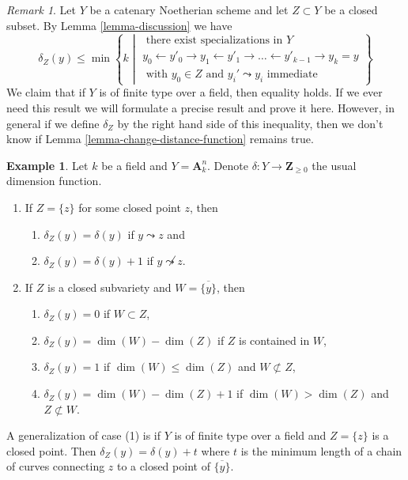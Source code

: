 \documentclass[10pt,a4paper]{amsart}
\theoremstyle{plain}
\theoremstyle{definition}
\newtheorem{example}[subsection]{Example}
\theoremstyle{remark}
\newtheorem{remark}[subsection]{Remark}
\numberwithin{equation}{subsection}
\begin{document}
\begin{remark}
\label{remark-discussion}
Let $Y$ be a catenary Noetherian scheme and let $Z \subset Y$
be a closed subset. By Lemma \ref{lemma-discussion} we have
$$
\delta_Z(y) \leq \min
\left\{ k \middle|
\begin{matrix}
\text{ there exist specializations in }Y \\
y_0 \leftarrow y'_0 \rightarrow y_1 \leftarrow y'_1 \rightarrow \ldots
\leftarrow y'_{k - 1} \rightarrow y_k = y \\
\text{ with }y_0 \in Z\text{ and }y_i' \leadsto y_i
\text{ immediate}
\end{matrix}
\right\}
$$
We claim that if $Y$ is of finite type over a field,
then equality holds. If we ever need this result we
will formulate a precise result and prove it here.
However, in general if we define $\delta_Z$
by the right hand side of this inequality, then we don't
know if Lemma \ref{lemma-change-distance-function} remains true.
\end{remark}

\begin{example}
\label{example-distance}
Let $k$ be a field and $Y = \mathbf{A}^n_k$. Denote
$\delta : Y \to \mathbf{Z}_{\geq 0}$ the usual dimension function.
\begin{enumerate}
\item If $Z = \{z\}$ for some closed point $z$, then
\begin{enumerate}
\item $\delta_Z(y) = \delta(y)$ if $y \leadsto z$ and
\item $\delta_Z(y) = \delta(y) + 1$ if $y \not \leadsto z$.
\end{enumerate}
\item If $Z$ is a closed subvariety and $W = \overline{\{y\}}$, then
\begin{enumerate}
\item $\delta_Z(y) = 0$ if $W \subset Z$,
\item $\delta_Z(y) = \dim(W) - \dim(Z)$ if $Z$ is contained in $W$,
\item $\delta_Z(y) = 1$ if $\dim(W) \leq \dim(Z)$ and $W \not \subset Z$,
\item $\delta_Z(y) = \dim(W) - \dim(Z) + 1$ if $\dim(W) > \dim(Z)$
and $Z \not \subset W$.
\end{enumerate}
\end{enumerate}
A generalization of case (1) is if $Y$ is of finite type over a field
and $Z = \{z\}$ is a closed point. Then $\delta_Z(y) = \delta(y) + t$
where $t$ is the minimum length of a chain of curves connecting
$z$ to a closed point of $\overline{\{y\}}$.
\end{example}
\end{document}
